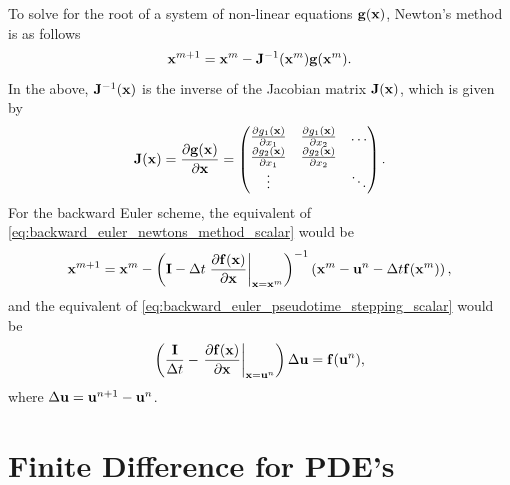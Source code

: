 \documentclass[oneside,a4paper,11pt]{report}
\begin{document}
To solve for the root of a system of non-linear equations $\mathbf{g}(\mathbf{x})$, Newton's method is as follows
\begin{equation}
    \mathbf{x}^{m+1} = \mathbf{x}^m - \mathbf{J}^{-1}(\mathbf{x}^m) \mathbf{g}(\mathbf{x}^m). 
\end{equation}
In the above, $\mathbf{J}^{-1}(\mathbf{x})$ is the inverse of the Jacobian matrix $\mathbf{J}(\mathbf{x})$, which is given by
\begin{equation}
    \mathbf{J}(\mathbf{x}) = \frac{\partial \mathbf{g}(\mathbf{x})}{\partial \mathbf{x}} = \begin{pmatrix} 
    \frac{\partial g_1(\mathbf{x})}{\partial x_1} & \frac{\partial g_1(\mathbf{x})}{\partial x_2} & \dots \\
    \frac{\partial g_2(\mathbf{x})}{\partial x_1} & \frac{\partial g_2(\mathbf{x})}{\partial x_2} & \\
    \vdots &        & \ddots
    \end{pmatrix}.
\end{equation}
For the backward Euler scheme, the equivalent of \cref{eq:backward_euler_newtons_method_scalar} would be
\begin{equation}
\label{eq:backward_euler_newtons_method_system}
    \mathbf{x}^{m+1} = \mathbf{x}^m - \left ( \mathbf{I} - \Delta t \left . \frac{\partial \mathbf{f}(\mathbf{x})}{\partial \mathbf{x}} \right |_{\mathbf{x} = \mathbf{x}^m} \right )^{-1} \left ( \mathbf{x}^m - \mathbf{u}^n - \Delta t \mathbf{f}(\mathbf{x}^m) \right ),
\end{equation}
and the equivalent of \cref{eq:backward_euler_pseudotime_stepping_scalar} would be
\begin{equation}
\label{eq:backward_euler_pseudotime_stepping_system}
    \left ( \frac{\mathbf{I}}{\Delta t} - \left . \frac{\partial \mathbf{f}(\mathbf{x})}{\partial \mathbf{x}} \right |_{\mathbf{x} = \mathbf{u}^n} \right ) \Delta \mathbf{u} = \mathbf{f}(\mathbf{u}^n),
\end{equation}
where $\Delta \mathbf{u} = \mathbf{u}^{n+1} - \mathbf{u}^n$.


\part{Finite Difference for PDE's}

\end{document}
